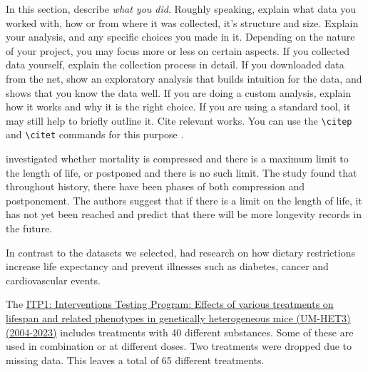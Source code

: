 In this section, describe \emph{what you did}. Roughly speaking, explain what data you worked with, how or from where it was collected, it's structure and size. Explain your analysis, and any specific choices you made in it. Depending on the nature of your project, you may focus more or less on certain aspects. If you collected data yourself, explain the collection process in detail. If you downloaded data from the net, show an exploratory analysis that builds intuition for the data, and shows that you know the data well. If you are doing a custom analysis, explain how it works and why it is the right choice. If you are using a standard tool, it may still help to briefly outline it. Cite relevant works. You can use the \verb|\citep| and \verb|\citet| commands for this purpose \citep{mackay2003information}.

% 

\citet{mccarthy2023mortality} investigated whether mortality is compressed and there is a maximum limit to the length of life, or postponed and there is no such limit. The study found that throughout history, there have been phases of both compression and postponement. The authors suggest that if there is a limit on the length of life, it has not yet been reached and predict that there will be more longevity records in the future. 

In contrast to the datasets we selected, \citet{fontana2010extending} had research on how dietary restrictions increase life expectancy and prevent illnesses such as diabetes, cancer and cardiovascular events. 



The \href{https://phenome.jax.org/projects/ITP1}{ITP1: Interventions Testing Program: Effects of various treatments on lifespan and related phenotypes in genetically heterogeneous mice (UM-HET3) (2004-2023)} includes treatments with 40 different substances. Some of these are used in combination or at different doses. Two treatments were dropped due to missing data. This leaves a total of 65 different treatments.

